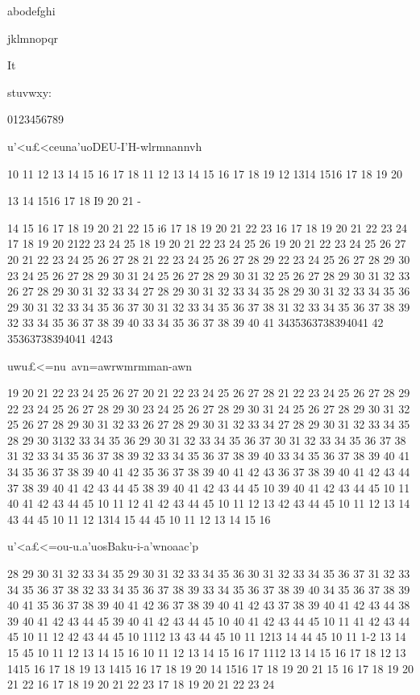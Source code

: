 {{{ 

 

 

 

abodefghi

jklmnopqr

It

stuvwxy:

0123456789

 

u'<u£<ceuna'uoDEU-I'H-wlrmnannvh

10 11 12 13 14 15 16 17 18
11 12 13 14 15 16 17 18 19
12 1314 1516 17 18 19 20

13 14 1516 17 18 I9 20 21 -

14 15 16 17 18 19 20 21 22
15 i6 17 18 19 20 21 22 23
16 17 18 19 20 21 22 23 24
17 18 19 20 2122 23 24 25
18 19 20 21 22 23 24 25 26
19 20 21 22 23 24 25 26 27
20 21 22 23 24 25 26 27 28
21 22 23 24 25 26 27 28 29
22 23 24 25 26 27 28 29 30
23 24 25 26 27 28 29 30 31
24 25 26 27 28 29 30 31 32
25 26 27 28 29 30 31 32 33
26 27 28 29 30 31 32 33 34
27 28 29 30 31 32 33 34 35
28 29 30 31 32 33 34 35 36
29 30 31 32 33 34 35 36 37
30 31 32 33 34 35 36 37 38
31 32 33 34 35 36 37 38 39
32 33 34 35 36 37 38 39 40
33 34 35 36 37 38 39 40 41
3435363738394041 42
35363738394041 4243

uwu£<=nu~avn=awrwmrmman-awn

19 20 21 22 23 24 25 26 27
20 21 22 23 24 25 26 27 28
21 22 23 24 25 26 27 28 29
22 23 24 25 26 27 28 29 30
23 24 25 26 27 28 29 30 31
24 25 26 27 28 29 30 31 32
25 26 27 28 29 30 31 32 33
26 27 28 29 30 31 32 33 34
27 28 29 30 31 32 33 34 35
28 29 30 3132 33 34 35 36
29 30 31 32 33 34 35 36 37
30 31 32 33 34 35 36 37 38
31 32 33 34 35 36 37 38 39
32 33 34 35 36 37 38 39 40
33 34 35 36 37 38 39 40 41
34 35 36 37 38 39 40 41 42
35 36 37 38 39 40 41 42 43
36 37 38 39 40 41 42 43 44
37 38 39 40 41 42 43 44 45
38 39 40 41 42 43 44 45 10
39 40 41 42 43 44 45 10 11
40 41 42 43 44 45 10 11 12
41 42 43 44 45 10 11 12 13
42 43 44 45 10 11 12 13 14
43 44 45 10 11 12 1314 15
44 45 10 11 12 13 14 15 16

u'<a£<=ou-u.a'uosBaku-i-a'wnoaac'p

28 29 30 31 32 33 34 35
29 30 31 32 33 34 35 36
30 31 32 33 34 35 36 37
31 32 33 34 35 36 37 38
32 33 34 35 36 37 38 39
33 34 35 36 37 38 39 40
34 35 36 37 38 39 40 41
35 36 37 38 39 40 41 42
36 37 38 39 40 41 42 43
37 38 39 40 41 42 43 44
38 39 40 41 42 43 44 45
39 40 41 42 43 44 45 10
40 41 42 43 44 45 10 11
41 42 43 44 45 10 11 12
42 43 44 45 10 1112 13
43 44 45 10 11 1213 14
44 45 10 11 1-2 13 14 15
45 10 11 12 13 14 15 16
10 11 12 13 14 15 16 17
1112 13 14 15 16 17 18
12 13 1415 16 17 18 19
13 1415 16 17 18 19 20
14 1516 17 18 19 20 21
15 16 17 18 19 20 21 22
16 17 18 19 20 21 22 23
17 18 19 20 21 22 23 24

}}}
